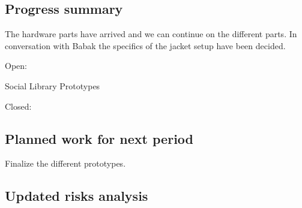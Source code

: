 \subsection{Progress summary}

The hardware parts have arrived and we can continue on the different parts. In conversation with Babak the specifics of the jacket setup have been decided.

Open:

Social Library
Prototypes

Closed:

\subsection{Planned work for next period}

Finalize the different prototypes. 

\subsection{Updated risks analysis}
